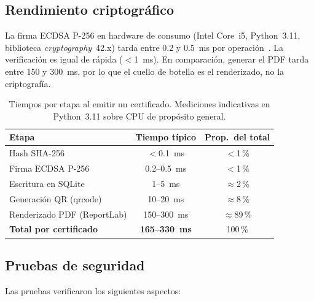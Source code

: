 \documentclass[11pt,letterpaper]{article}
\begin{document}
\subsection{Rendimiento criptogr\'afico}

La firma ECDSA P-256 en hardware de consumo (Intel Core~i5, Python~3.11,
biblioteca \textit{cryptography}~42.x) tarda entre 0.2 y 0.5~ms por
operaci\'on~\cite{cryptographylib}. La verificaci\'on es igual de r\'apida
($<$1~ms). En comparaci\'on, generar el PDF tarda entre 150 y 300~ms, por lo que
el cuello de botella es el renderizado, no la criptograf\'ia.

\begin{table}[H]
  \centering
  \caption{Tiempos por etapa al emitir un certificado. Mediciones indicativas en
           Python~3.11 sobre CPU de prop\'osito general.}
  \label{tab:tiempos}
  \begin{tabular}{lcc}
    \toprule
    \textbf{Etapa}                & \textbf{Tiempo t\'ipico} &
    \textbf{Prop.\ del total} \\
    \midrule
    Hash SHA-256                  & $<$0.1~ms    & $<$1\,\%    \\
    Firma ECDSA P-256             & 0.2--0.5~ms  & $<$1\,\%    \\
    Escritura en SQLite           & 1--5~ms      & $\approx$2\,\%  \\
    Generaci\'on QR (qrcode)      & 10--20~ms    & $\approx$8\,\%  \\
    Renderizado PDF (ReportLab)   & 150--300~ms  & $\approx$89\,\% \\
    \midrule
    \textbf{Total por certificado}& \textbf{165--330~ms} & 100\,\% \\
    \bottomrule
  \end{tabular}
\end{table}

\subsection{Pruebas de seguridad}

Las pruebas verificaron los siguientes aspectos:
\end{document}
